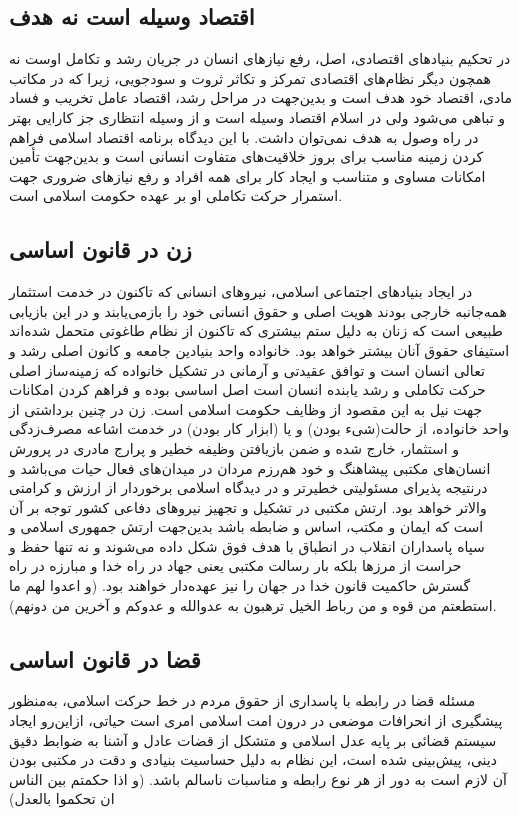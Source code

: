 \documentclass[12pt]{article}
\begin{document}
\subsection*{اقتصاد وسیله است نه هدف‌}
در تحکیم بنیادهای اقتصادی‌، اصل‌، رفع نیازهای انسان در جریان رشد و تکامل اوست نه همچون دیگر نظام‌های اقتصادی تمرکز و تکاثر ثروت و سودجویی‌، زیرا که در مکاتب مادی‌، اقتصاد خود هدف است و بدین‌جهت در مراحل رشد، اقتصاد عامل تخریب و فساد و تباهی می‌شود ولی در اسلام اقتصاد وسیله است و از وسیله ‌انتظاری جز کارایی ‌بهتر در راه وصول به هدف نمی‌توان داشت. با این دیدگاه برنامه اقتصاد اسلامی فراهم کردن زمینه مناسب برای بروز خلاقیت‌های متفاوت انسانی است و بدین‌جهت تأمین امکانات مساوی و متناسب و ایجاد کار برای همه افراد و رفع نیازهای ضروری جهت استمرار حرکت تکاملی او بر عهده حکومت اسلامی است.

\subsection*{زن در قانون اساسی‌}
در ایجاد بنیادهای اجتماعی اسلامی‌، نیروهای انسانی که تاکنون در خدمت استثمار همه‌جانبه خارجی بودند هویت اصلی و حقوق انسانی خود را بازمی‌یابند و در این بازیابی طبیعی است که زنان به دلیل ستم بیشتری که تاکنون از نظام طاغوتی متحمل شده‌اند استیفای حقوق آنان بیشتر خواهد بود. خانواده واحد بنیادین جامعه و کانون اصلی رشد و تعالی انسان است و توافق عقیدتی و آرمانی در تشکیل خانواده که زمینه‌ساز اصلی حرکت تکاملی و رشد یابنده انسان است اصل اساسی بوده و فراهم کردن امکانات جهت نیل به این مقصود از وظایف حکومت اسلامی است‌. زن در چنین برداشتی از واحد خانواده‌، از حالت‌(شی‌ء بودن‌) و یا (ابزار کار بودن) در خدمت اشاعه مصرف‌زدگی و استثمار، خارج شده و ضمن بازیافتن وظیفه خطیر و پرارج مادری در پرورش انسان‌های مکتبی پیشاهنگ و خود هم‌رزم مردان در میدان‌های فعال حیات می‌باشد و درنتیجه پذیرای مسئولیتی‌ خطیرتر و در دیدگاه اسلامی برخوردار از ارزش و کرامتی والاتر خواهد بود.
ارتش مکتبی ‌در تشکیل و تجهیز نیروهای دفاعی کشور توجه بر آن است که ایمان و مکتب‌، اساس و ضابطه باشد بدین‌جهت ارتش جمهوری اسلامی و سپاه پاسداران انقلاب در انطباق با هدف فوق شکل داده ‌می‌شوند و نه تنها حفظ و حراست از مرزها بلکه بار رسالت مکتبی یعنی جهاد در راه خدا و مبارزه در راه گسترش حاکمیت قانون خدا در جهان را نیز عهده‌دار خواهند بود. (و اعدوا لهم ما استطعتم من قوه و من رباط الخیل ترهبون به عدوالله و عدوکم و آخرین من دونهم).

\subsection*{قضا در قانون اساسی}
مسئله قضا در رابطه با پاسداری از حقوق مردم در خط حرکت اسلامی، به‌منظور پیشگیری از انحرافات موضعی در درون امت اسلامی امری است حیاتی‌، ازاین‌رو ایجاد سیستم قضائی بر پایه عدل اسلامی و متشکل از قضات عادل و آشنا به ضوابط دقیق دینی، پیش‌بینی شده است‌، این نظام به دلیل حساسیت بنیادی و دقت در مکتبی بودن آن لازم است به دور از هر نوع رابطه و مناسبات‌ ناسالم باشد. (و اذا حکمتم بین الناس ان تحکموا بالعدل)
\end{document}
